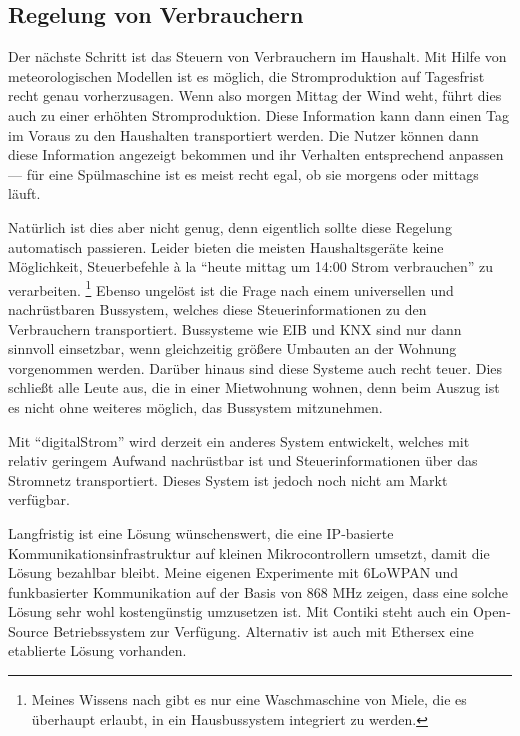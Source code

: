 \documentclass[12pt,BCOR=8.5mm]{scrartcl}
\begin{document}

\subsection{Regelung von Verbrauchern}\label{sub:steuern}

Der nächste Schritt ist das Steuern von Verbrauchern im Haushalt.
Mit Hilfe von meteorologischen Modellen ist es möglich, die
Stromproduktion auf Tagesfrist recht genau vorherzusagen. Wenn also
morgen Mittag der Wind weht, führt dies auch zu einer erhöhten
Stromproduktion. Diese Information kann dann einen Tag im Voraus zu den
Haushalten transportiert werden. Die Nutzer können dann diese
Information angezeigt bekommen und ihr Verhalten entsprechend anpassen
--- für eine Spülmaschine ist es meist recht egal, ob sie morgens oder
mittags läuft.

Natürlich ist dies aber nicht genug, denn eigentlich sollte diese
Regelung automatisch passieren. Leider bieten die meisten
Haushaltsgeräte keine Möglichkeit, Steuerbefehle à la "`heute mittag um
14:00 Strom verbrauchen"' zu verarbeiten. \footnote{Meines Wissens nach
gibt es nur eine Waschmaschine von Miele, die es überhaupt erlaubt, in
ein Hausbussystem integriert zu werden.} Ebenso ungelöst ist die Frage
nach einem universellen und nachrüstbaren Bussystem, welches diese
Steuerinformationen zu den Verbrauchern transportiert. Bussysteme wie
EIB und KNX sind nur dann sinnvoll einsetzbar, wenn gleichzeitig größere
Umbauten an der Wohnung vorgenommen werden. Darüber hinaus sind diese
Systeme auch recht teuer. Dies schließt alle Leute aus, die in einer
Mietwohnung wohnen, denn beim Auszug ist es nicht ohne weiteres
möglich, das Bussystem mitzunehmen.

Mit "`digitalStrom"' wird derzeit ein anderes System entwickelt, welches
mit relativ geringem Aufwand nachrüstbar ist und Steuerinformationen
über das Stromnetz transportiert. Dieses System ist jedoch noch nicht am
Markt verfügbar.


Langfristig ist eine Lösung wünschenswert, die eine IP-basierte
Kommunikationsinfrastruktur auf kleinen Mikrocontrollern umsetzt, damit
die Lösung bezahlbar bleibt. Meine eigenen Experimente mit 6LoWPAN und
funkbasierter Kommunikation auf der Basis von 868 MHz zeigen, dass eine
solche Lösung sehr wohl kostengünstig umzusetzen ist. Mit Contiki  steht auch ein Open-Source
Betriebssystem zur Verfügung. Alternativ ist auch mit Ethersex
 eine etablierte Lösung vorhanden. 
\end{document}
